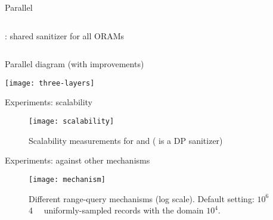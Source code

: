 \begin{frame}{Parallel \epsolute{}}
\begin{columns}[t]
\begin{column}{0.5\textwidth}
{\begin{block}{\protocolShared{}: shared sanitizer \serverDS{} for all ORAMs}
					\end{block}
				}

			\end{column}


		\end{columns}


	\end{frame}

	\begin{frame}{Parallel \epsolute{} diagram (with improvements)}

		\centering
		\texttt{[image: three-layers]}

	\end{frame}

	\begin{frame}{Experiments: scalability}

		\begin{figure}[h]
			\centering
			\texttt{[image: scalability]}
			\caption{Scalability measurements for \protocolShared{} and \protocolSeparate{} (\serverDS{} is a DP sanitizer)}%
		\end{figure}

	\end{frame}

	\begin{frame}{Experiments: against other mechanisms}

		\begin{figure}[h]
			\centering
			\texttt{[image: mechanism]}
			\caption{
				\centering
				Different range-query mechanisms (log scale).  %
				Default setting: $10^6$ \SI{4}{\kibi\byte} uniformly-sampled records with the domain $10^4$.
			}%
		\end{figure}

	\end{frame}
